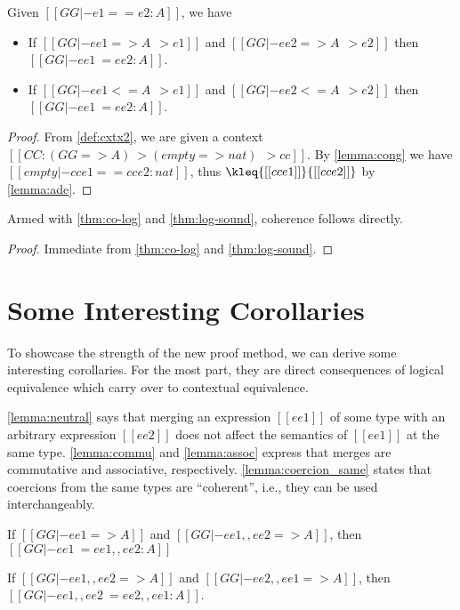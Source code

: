 \begin{theorem} \label{thm:log-sound}
  Given $[[GG |- e1 == e2 : A]]$, we have
  \begin{itemize}
  \item If $[[ GG |- ee1 => A ~~> e1]]$ and $[[ GG |- ee2 => A ~~> e2]]$ then
    $[[ GG |- ee1 ~= ee2 : A ]]$.
  \item If $[[ GG |- ee1 <= A ~~> e1]]$ and $[[ GG |- ee2 <= A ~~> e2]]$ then
    $[[ GG |- ee1 ~= ee2 : A ]]$.
  \end{itemize}
\end{theorem}
\begin{proof}
  From \cref{def:cxtx2}, we are given a context $[[  CC : (GG => A) ~> (empty => nat) ~~> cc ]]$. By \cref{lemma:cong}
  we have $[[  empty |- cc{e1} == cc{e2} : nat  ]]$, thus $  \kleq{[[ cc{e1} ]]}{ [[cc{e2} ]]}    $ by \cref{lemma:ade}.
\end{proof}


Armed with \cref{thm:co-log} and \cref{thm:log-sound}, coherence follows directly.
\coherence*
\begin{proof}
  Immediate from \cref{thm:co-log} and \cref{thm:log-sound}.
\end{proof}

\section{Some Interesting Corollaries}

To showcase the strength of the new proof method, we can derive some
interesting corollaries. For the most part, they are direct consequences of
logical equivalence which carry over to contextual equivalence.


\cref{lemma:neutral} says that merging an expression $[[ee1]]$ of some type with
an arbitrary expression $[[ee2]]$ does not affect the semantics of $[[ee1]]$ at
the same type. \cref{lemma:commu} and \cref{lemma:assoc} express that merges are
commutative and associative, respectively. \cref{lemma:coercion_same} states
that coercions from the same types are ``coherent'', i.e., they can be used
interchangeably.

\begin{corollary}[Neutrality] \label{lemma:neutral}
  If $[[GG |- ee1 => A ]]$ and $[[GG |- ee1 ,, ee2 => A ]]$, then
  $[[GG |- ee1 ~= ee1 ,, ee2 : A]]$
\end{corollary}

\begin{corollary}[Commutativity] \label{lemma:commu}
  If $[[GG |- ee1 ,, ee2 => A ]]$ and $[[GG |- ee2 ,, ee1 => A ]]$, then
  $[[GG |- ee1 ,, ee2 ~= ee2 ,, ee1 : A]]$.
\end{corollary}


